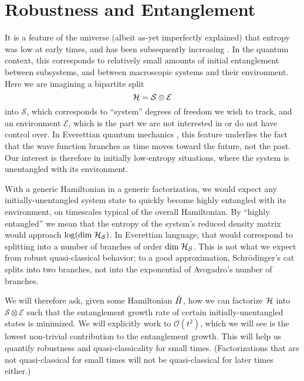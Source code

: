 \documentclass[aps,pra,onecolumn,nofootinbib,11pt,tightenlines]{revtex4-1}
\begin{document}
\section{Robustness and Entanglement}
\label{sec:robustness}

It is a feature of the universe (albeit as-yet imperfectly explained) that entropy was low at early times, and has been subsequently increasing \citep{penrose1979singularities,albert}.
In the quantum context, this corresponds to relatively small amounts of initial entanglement between subsystems, and between macroscopic systems and their environment.
Here we are imagining a bipartite split
\begin{equation}
\hs = \mathcal{S} \otimes \mathcal{E}
\end{equation}
into $\mathcal{S}$, which corresponds to ``system'' degrees of freedom we wish to track, and an environment $\mathcal{E}$, which is the part we are not interested in or do not have control over.
In Everettian quantum mechanics \cite{everett1957relative}, this feature underlies the fact that the wave function branches as time moves toward the future, not the past.
Our interest is therefore in initially low-entropy situations, where the system is unentangled with its environment.

With a generic Hamiltonian in a generic factorization, we would expect any initially-unentangled system state to quickly become highly entangled with its environment, on timescales typical of the overall Hamiltonian.
By ``highly entangled'' we mean that the entropy of the system's reduced density matrix would approach $\log(\mathrm{dim}\; \mathcal{H}_\mathcal{S})$.
In Everettian language, that would correspond to splitting into a number of branches of order $\mathrm{dim}\; \mathcal{H}_\mathcal{S}$.
This is not what we expect from robust quasi-classical behavior; to a good approximation, Schr\"odinger's cat splits into two branches, not into the exponential of Avogadro's number of branches.

We will therefore ask, given some Hamiltonian $\hat{H}$, how we can factorize $\mathcal{H}$ into $ \mathcal{S} \otimes \mathcal{E}$ such that the entanglement growth rate of certain initially-unentangled states is minimized.
We will explicitly work to $\mathcal{O}(t^2)$, which we will see is the lowest non-trivial contribution to the entanglement growth. This will help us quantify robustness and quasi-classicality for small times. (Factorizations that are not quasi-classical for small times will not be quasi-classical for later times either.)
 
\end{document}
